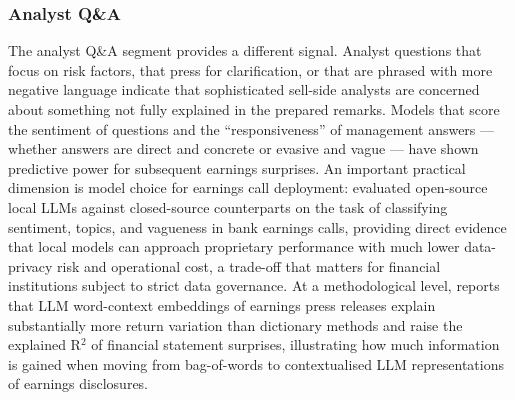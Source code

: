 \subsubsection*{Analyst Q\&A}

The analyst Q\&A segment provides a different signal. Analyst questions that focus on risk factors, that press for clarification, or that are phrased with more negative language indicate that sophisticated sell-side analysts are concerned about something not fully explained in the prepared remarks. Models that score the sentiment of questions and the ``responsiveness'' of management answers --- whether answers are direct and concrete or evasive and vague --- have shown predictive power for subsequent earnings surprises. An important practical dimension is model choice for earnings call deployment: \citet{CookKazinnik2023} evaluated open-source local LLMs against closed-source counterparts on the task of classifying sentiment, topics, and vagueness in bank earnings calls, providing direct evidence that local models can approach proprietary performance with much lower data-privacy risk and operational cost, a trade-off that matters for financial institutions subject to strict data governance. At a methodological level, \citet{Siano2025} reports that LLM word-context embeddings of earnings press releases explain substantially more return variation than dictionary methods and raise the explained R$^{2}$ of financial statement surprises, illustrating how much information is gained when moving from bag-of-words to contextualised LLM representations of earnings disclosures.

